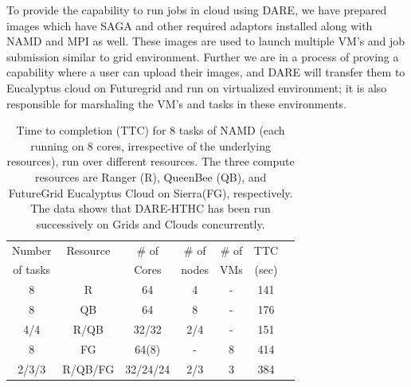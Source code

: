 \documentclass[]{article}
\begin{document}


To provide the capability to run jobs in cloud using DARE, we have
prepared images which have SAGA and other required adaptors installed
along with NAMD and MPI as well.  These images are used to launch
multiple VM's and job submission similar to grid environment. Further
we are in a process of proving a capability where a user can upload
their images, and DARE will transfer them to Eucalyptus cloud on
Futuregrid and run on virtualized environment; it is also responsible
for marshaling the VM's and tasks in these environments.

 \begin{table}
\small
 \begin{tabular}{|c|c|c|c|c|c|c|} 
 \hline 
 Number           & Resource    & \# of &  \# of     &     \# of     &	TTC  \\
of tasks                &     &  Cores    &nodes&   VMs  & (sec) \\  
\hline
8& R&	64	&4 & - &141\\
\hline                  
8& QB	&	64& 8 &	-&176 \\
\hline
4/4&R/QB	&	32/32 &2/4&-&151\\
\hline
8&FG	&	64(8) & - &8&414 \\
\hline
2/3/3&R/QB/FG	&32/24/24&2/3&	3 &384\\
\hline


\end{tabular}
\caption{Time to completion (TTC) for 8 tasks of NAMD (each running on 8 cores,
  irrespective of the underlying resources), run over different resources. The three
  compute resources are Ranger (R), QueenBee (QB), 
  and  FutureGrid  Eucalyptus Cloud on Sierra(FG), respectively. The
  data shows that DARE-HTHC has been run successively on Grids and
  Clouds concurrently.}
 \label{table:HTHP-Distributed} 
\end{table}
\end{document}
